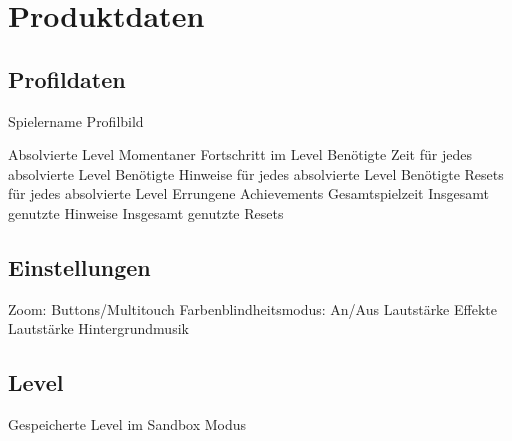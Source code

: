 \section{Produktdaten}

\subsection{Profildaten}
\begin{requirements}
	\begin{requirements}
		 Spielername
		 Profilbild
	\end{requirements}
	
	\req [Spielfortschritt] {D20}
	\begin{requirements}
		 Absolvierte Level
		 Momentaner Fortschritt im Level
		 Benötigte Zeit für jedes absolvierte Level
		 Benötigte Hinweise für jedes absolvierte Level
		 Benötigte Resets für jedes absolvierte Level
		 Errungene Achievements
		 Gesamtspielzeit
		 Insgesamt genutzte Hinweise
		 Insgesamt genutzte Resets
	\end{requirements}
\end{requirements}

\subsection{Einstellungen}
\begin{requirements}
	 Zoom: Buttons/Multitouch
	 Farbenblindheitsmodus: An/Aus
	 Lautstärke Effekte
	 Lautstärke Hintergrundmusik
	
\end{requirements}

\subsection{Level}
\begin{requirements}
	 Gespeicherte Level im Sandbox Modus
\end{requirements}
	
